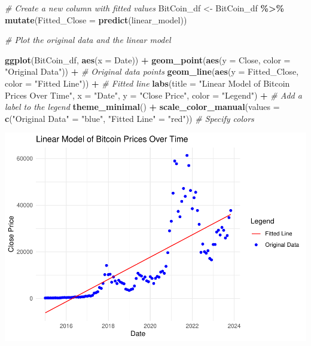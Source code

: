 \documentclass[
]{book}
\newenvironment{Shaded}{\begin{snugshade}}{\end{snugshade}}
\newcommand{\AttributeTok}[1]{\textcolor[rgb]{0.13,0.29,0.53}{#1}}
\newcommand{\CommentTok}[1]{\textcolor[rgb]{0.56,0.35,0.01}{\textit{#1}}}
\newcommand{\FunctionTok}[1]{\textcolor[rgb]{0.13,0.29,0.53}{\textbf{#1}}}
\newcommand{\NormalTok}[1]{#1}
\newcommand{\OtherTok}[1]{\textcolor[rgb]{0.56,0.35,0.01}{#1}}
\newcommand{\SpecialCharTok}[1]{\textcolor[rgb]{0.81,0.36,0.00}{\textbf{#1}}}
\newcommand{\StringTok}[1]{\textcolor[rgb]{0.31,0.60,0.02}{#1}}
\begin{document}
\begin{Shaded}
\begin{Highlighting}[]
\CommentTok{\# Create a new column with fitted values}
\NormalTok{BitCoin\_df }\OtherTok{\textless{}{-}}\NormalTok{ BitCoin\_df }\SpecialCharTok{\%\textgreater{}\%}
\FunctionTok{mutate}\NormalTok{(}\AttributeTok{Fitted\_Close =} \FunctionTok{predict}\NormalTok{(linear\_model))}

\CommentTok{\# Plot the original data and the linear model}

\FunctionTok{ggplot}\NormalTok{(BitCoin\_df, }\FunctionTok{aes}\NormalTok{(}\AttributeTok{x =}\NormalTok{ Date)) }\SpecialCharTok{+}
\FunctionTok{geom\_point}\NormalTok{(}\FunctionTok{aes}\NormalTok{(}\AttributeTok{y =}\NormalTok{ Close, }\AttributeTok{color =} \StringTok{"Original Data"}\NormalTok{)) }\SpecialCharTok{+}  \CommentTok{\# Original data points}
\FunctionTok{geom\_line}\NormalTok{(}\FunctionTok{aes}\NormalTok{(}\AttributeTok{y =}\NormalTok{ Fitted\_Close, }\AttributeTok{color =} \StringTok{"Fitted Line"}\NormalTok{)) }\SpecialCharTok{+}  \CommentTok{\# Fitted line}
\FunctionTok{labs}\NormalTok{(}\AttributeTok{title =} \StringTok{"Linear Model of Bitcoin Prices Over Time"}\NormalTok{,}
     \AttributeTok{x =} \StringTok{"Date"}\NormalTok{,}
     \AttributeTok{y =} \StringTok{"Close Price"}\NormalTok{,}
     \AttributeTok{color =} \StringTok{"Legend"}\NormalTok{) }\SpecialCharTok{+}  \CommentTok{\# Add a label to the legend}
\FunctionTok{theme\_minimal}\NormalTok{() }\SpecialCharTok{+}
\FunctionTok{scale\_color\_manual}\NormalTok{(}\AttributeTok{values =} \FunctionTok{c}\NormalTok{(}\StringTok{"Original Data"} \OtherTok{=} \StringTok{"blue"}\NormalTok{, }\StringTok{"Fitted Line"} \OtherTok{=} \StringTok{"red"}\NormalTok{))  }\CommentTok{\# Specify colors}
\end{Highlighting}
\end{Shaded}

\includegraphics{bookdown-demo_files/figure-latex/unnamed-chunk-18-1.pdf}
\end{document}
